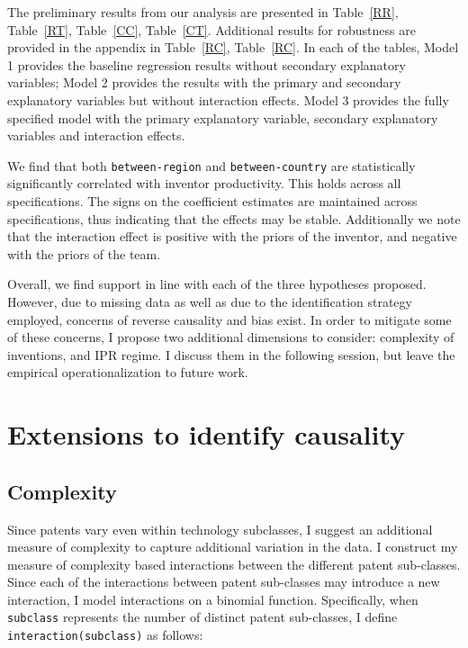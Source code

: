 \documentclass[12pt]{article}
\begin{document}
\newpage

\onehalfspacing
The preliminary results from our analysis are presented in Table~\ref{RR},  Table~\ref{RT}, Table~\ref{CC},  Table~\ref{CT}. Additional results for robustness are provided in the appendix in Table~\ref{RC},  Table~\ref{RC}. In each of the tables, Model 1 provides the baseline regression results without secondary explanatory variables; Model 2 provides the results with the primary and secondary explanatory variables but without interaction effects. Model 3 provides the fully specified model with the primary explanatory variable, secondary explanatory variables and interaction effects. \par

We find that both \texttt{between-region} and \texttt{between-country} are statistically significantly correlated with inventor productivity. This holds across all specifications. The  signs on the coefficient estimates are maintained across specifications, thus indicating that the effects may be stable. Additionally we note that the interaction effect is positive with the priors of the inventor, and negative with the priors of the team.

Overall, we find support in line with each of the three hypotheses proposed. However, due to missing data as well as due to the identification strategy employed, concerns of reverse causality and bias exist. In order to mitigate some of these concerns, I propose two additional dimensions to consider: complexity of inventions, and IPR regime. I discuss them in the following session, but leave the empirical operationalization to future work.


\section{Extensions to identify causality}
\subsection{Complexity}
Since patents vary even within technology subclasses, I suggest an additional measure of complexity to capture additional variation in the data. I construct my measure of complexity based interactions between the different patent sub-classes. Since each of the interactions between patent sub-classes may introduce a new interaction, I model interactions on a binomial function. Specifically, when \verb|subclass| represents the number of distinct patent sub-classes, I define  \verb|interaction(subclass)| as follows:
\end{document}
